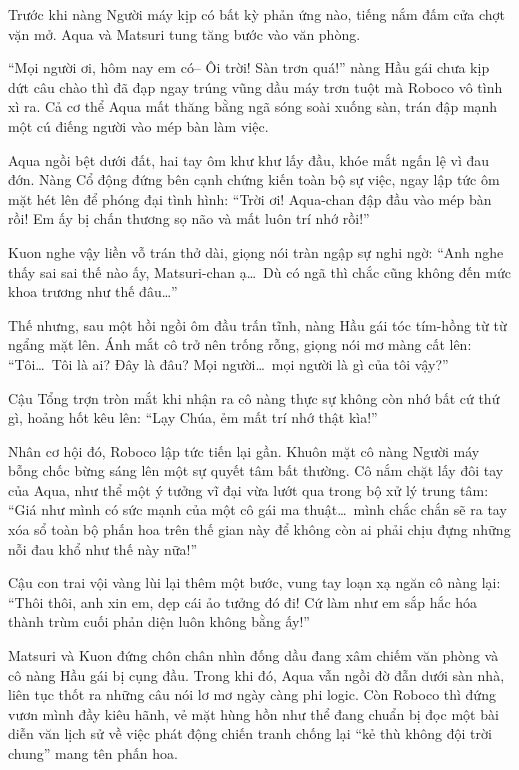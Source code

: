 \documentclass[../main.tex]{subfiles}
\begin{document}
Trước khi nàng Người máy kịp có bất kỳ phản ứng nào, tiếng nắm đấm cửa chợt vặn mở. Aqua và Matsuri tung tăng bước vào văn phòng.

``Mọi người ơi, hôm nay em có-- Ôi trời! Sàn trơn quá!'' nàng Hầu gái chưa kịp dứt câu chào thì đã đạp ngay trúng vũng dầu máy trơn tuột mà Roboco vô tình xì ra. Cả cơ thể Aqua mất thăng bằng ngã sóng soài xuống sàn, trán đập mạnh một cú điếng người vào mép bàn làm việc.

Aqua ngồi bệt dưới đất, hai tay ôm khư khư lấy đầu, khóe mắt ngấn lệ vì đau đớn. Nàng Cổ động đứng bên cạnh chứng kiến toàn bộ sự việc, ngay lập tức ôm mặt hét lên để phóng đại tình hình: ``Trời ơi! Aqua-chan đập đầu vào mép bàn rồi! Em ấy bị chấn thương sọ não và mất luôn trí nhớ rồi!''

Kuon nghe vậy liền vỗ trán thở dài, giọng nói tràn ngập sự nghi ngờ: ``Anh nghe thấy sai sai thế nào ấy, Matsuri-chan ạ\dots\ Dù có ngã thì chắc cũng không đến mức khoa trương như thế đâu\dots''

Thế nhưng, sau một hồi ngồi ôm đầu trấn tĩnh, nàng Hầu gái tóc tím-hồng từ từ ngẩng mặt lên. Ánh mắt cô trở nên trống rỗng, giọng nói mơ màng cất lên: ``Tôi\dots\ Tôi là ai? Đây là đâu? Mọi người\dots\ mọi người là gì của tôi vậy?''

Cậu Tổng trợn tròn mắt khi nhận ra cô nàng thực sự không còn nhớ bất cứ thứ gì, hoảng hốt kêu lên: ``Lạy Chúa, ẻm mất trí nhớ thật kìa!''

Nhân cơ hội đó, Roboco lập tức tiến lại gần. Khuôn mặt cô nàng Người máy bỗng chốc bừng sáng lên một sự quyết tâm bất thường. Cô nắm chặt lấy đôi tay của Aqua, như thể một ý tưởng vĩ đại vừa lướt qua trong bộ xử lý trung tâm: ``Giá như mình có sức mạnh của một cô gái ma thuật\dots\ mình chắc chắn sẽ ra tay xóa sổ toàn bộ phấn hoa trên thế gian này để không còn ai phải chịu đựng những nỗi đau khổ như thế này nữa!''

Cậu con trai vội vàng lùi lại thêm một bước, vung tay loạn xạ ngăn cô nàng lại: ``Thôi thôi, anh xin em, dẹp cái ảo tưởng đó đi! Cứ làm như em sắp hắc hóa thành trùm cuối phản diện luôn không bằng ấy!''

Matsuri và Kuon đứng chôn chân nhìn đống dầu đang xâm chiếm văn phòng và cô nàng Hầu gái bị cụng đầu. Trong khi đó, Aqua vẫn ngồi đờ đẫn dưới sàn nhà, liên tục thốt ra những câu nói lơ mơ ngày càng phi logic. Còn Roboco thì đứng vươn mình đầy kiêu hãnh, vẻ mặt hùng hồn như thể đang chuẩn bị đọc một bài diễn văn lịch sử về việc phát động chiến tranh chống lại ``kẻ thù không đội trời chung'' mang tên phấn hoa.
\end{document}
